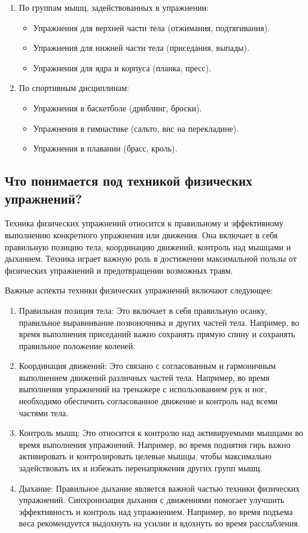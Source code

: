\begin{enumerate}
    \item По группам мышц, задействованных в упражнении:
          \begin{itemize}
              \item Упражнения для верхней части тела (отжимания, подтягивания).
              \item Упражнения для нижней части тела (приседания, выпады).
              \item Упражнения для ядра и корпуса (планка, пресс).
          \end{itemize}

    \item По спортивным дисциплинам:
          \begin{itemize}
              \item Упражнения в баскетболе (дриблинг, броски).
              \item Упражнения в гимнастике (сальто, вис на перекладине).
              \item Упражнения в плавании (брасс, кроль).
          \end{itemize}
\end{enumerate}

\subsection{Что понимается под техникой физических упражнений?}

Техника физических упражнений относится к правильному и эффективному выполнению конкретного упражнения или движения. Она включает в себя правильную позицию тела, координацию движений, контроль над мышцами и дыханием. Техника играет важную роль в достижении максимальной пользы от физических упражнений и предотвращении возможных травм.

Важные аспекты техники физических упражнений включают следующее:
\begin{enumerate}
    \item Правильная позиция тела: Это включает в себя правильную осанку, правильное выравнивание позвоночника и других частей тела. Например, во время выполнения приседаний важно сохранять прямую спину и сохранять правильное положение коленей.
    \item Координация движений: Это связано с согласованным и гармоничным выполнением движений различных частей тела. Например, во время выполнения упражнений на тренажере с использованием рук и ног, необходимо обеспечить согласованное движение и контроль над всеми частями тела.
    \item Контроль мышц: Это относится к контролю над активируемыми мышцами во время выполнения упражнений. Например, во время поднятия гирь важно активировать и контролировать целевые мышцы, чтобы максимально задействовать их и избежать перенапряжения других групп мышц.
    \item Дыхание: Правильное дыхание является важной частью техники физических упражнений. Синхронизация дыхания с движениями помогает улучшить эффективность и контроль над упражнением. Например, во время подъема веса рекомендуется выдохнуть на усилии и вдохнуть во время расслабления.
\end{enumerate}

